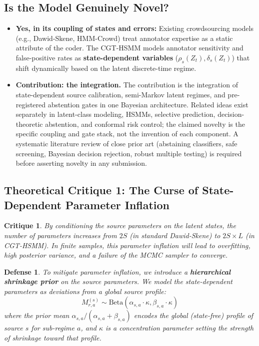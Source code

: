 \documentclass[11pt,a4paper]{article}
\newtheorem{critique}{Critique}
\newtheorem{defense}{Defense}
\begin{document}
\subsection{Is the Model Genuinely Novel?}
\begin{itemize}
    \item \textbf{Yes, in its coupling of states and errors:} Existing crowdsourcing models (e.g., Dawid-Skene, HMM-Crowd) treat annotator expertise as a static attribute of the coder. The CGT-HSMM models annotator sensitivity and false-positive rates as \textbf{state-dependent variables} ($\rho_s(Z_t), \delta_s(Z_t)$) that shift dynamically based on the latent discrete-time regime.
    \item \textbf{Contribution: the integration.} The contribution is the integration of state-dependent source calibration, semi-Markov latent regimes, and pre-registered abstention gates in one Bayesian architecture. Related ideas exist separately in latent-class modeling, HSMMs, selective prediction, decision-theoretic abstention, and conformal risk control; the claimed novelty is the specific coupling and gate stack, not the invention of each component. A systematic literature review of close prior art (abstaining classifiers, safe screening, Bayesian decision rejection, robust multiple testing) is required before asserting novelty in any submission. %
\end{itemize}

\subsection{Theoretical Critique 1: The Curse of State-Dependent Parameter Inflation}
\begin{critique}
By conditioning the source parameters on the latent states, the number of parameters increases from $2S$ (in standard Dawid-Skene) to $2S \times L$ (in CGT-HSMM). In finite samples, this parameter inflation will lead to overfitting, high posterior variance, and a failure of the MCMC sampler to converge.
\end{critique}

\begin{defense}
To mitigate parameter inflation, we introduce a \textbf{hierarchical shrinkage prior} on the source parameters. We model the state-dependent parameters as deviations from a global source profile:
\[
M^{(s)}_{r, a} \sim \text{Beta}(\alpha_{s, a} \cdot \kappa, \beta_{s, a} \cdot \kappa)
\]
where the prior mean $\alpha_{s, a} / (\alpha_{s, a} + \beta_{s, a})$ encodes the global (state-free) profile of source $s$ for sub-regime $a$, and $\kappa$ is a concentration parameter setting the strength of shrinkage toward that profile. %
\end{defense}
\end{document}
